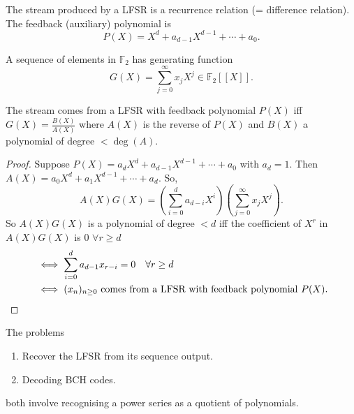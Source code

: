 \documentclass{article}
\newcommand{\F}{\mathbb{F}}
\newcommand{\1}[1]{\mathbbm{1}_{#1}}
\begin{document}
The stream produced by a LFSR is a recurrence relation (= difference relation).
The feedback (auxiliary) polynomial is
\begin{equation*}
    P(X) = X^d + a_{d-1} X^{d-1} + \dotsb + a_0.
\end{equation*}
\begin{defi}
    A sequence of elements in $\F_2$ has generating function
    \begin{equation*}
        G(X) = \sum_{j=0}^\infty x_j X^j \in \F_2[[X]].
    \end{equation*}
\end{defi}
\begin{nthm}\label{thm:2.35}
    The stream comes from a LFSR with feedback polynomial $P(X)$ iff $G(X) = \frac{B(X)}{A(X)}$ where $A(X)$ is the reverse of $P(X)$ and $B(X)$ a polynomial of degree $< \deg(A)$.
\end{nthm}
\begin{proof}
    Suppose $P(X) = a_d X^d + a_{d-1} X^{d-1} + \dotsb + a_0$ with $a_d = 1$.
    Then $A(X) = a_0 X^d + a_1 X^{d-1} + \dotsb + a_d$. So,
    \begin{equation*}
        A(X) G(X) = \left(\sum_{i=0}^d a_{d-i} X^i\right) \left(\sum_{j=0}^\infty x_j X^j\right).
    \end{equation*}
    So $A(X) G(X)$ is a polynomial of degree $<d$ iff the coefficient of $X^r$ in $A(X) G(X)$ is $0$ $\forall r \geq d$
    \begin{align*}
        &\iff \sum_{i=0}^d a_{d-1} x_{r-i} = 0 \quad \forall r \geq d \\
        &\iff (x_n)_{n \geq 0} \text{ comes from a LFSR with feedback polynomial } P(X). \qedhere
    \end{align*}
\end{proof}
\begin{remark}
    The problems
    \begin{enumerate}[label=(\roman*)]
        \item Recover the LFSR from its sequence output.
        \item Decoding BCH codes.
    \end{enumerate}
    both involve recognising a power series as a quotient of polynomials.
\end{remark}
\end{document}
